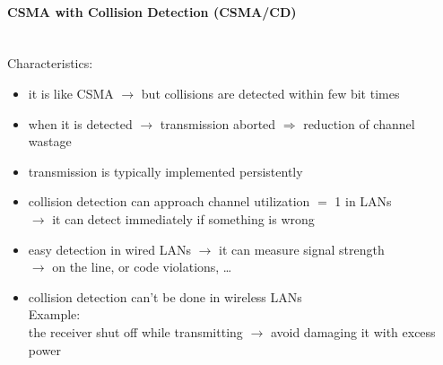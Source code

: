 \paragraph{CSMA with Collision Detection (CSMA/CD)}\mbox{}\\[0.2cm]
Characteristics:
\begin{itemize}
    \item it is like CSMA $\rightarrow$ but collisions are detected within few bit times
    \item when it is detected $\rightarrow$ transmission aborted $\Rightarrow$ reduction of channel wastage
    \item transmission is typically implemented persistently
    \item collision detection can approach channel utilization $=$ 1 in LANs\\ $\rightarrow$ it can detect immediately if something is wrong
    \item easy detection in wired LANs $\rightarrow$ it can
    measure signal strength\\ $\rightarrow$ on the line, or code violations, \dots
    \item collision detection can't be done in wireless LANs\\
    Example:\\
    the receiver shut off while transmitting $\rightarrow$ avoid damaging it with excess power
\end{itemize}


